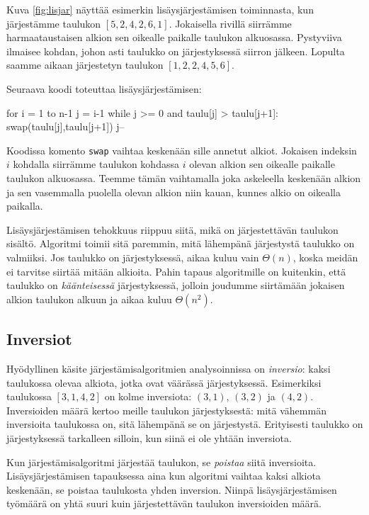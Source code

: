 Kuva \ref{fig:lisjar} näyttää esimerkin lisäysjärjestämisen
toiminnasta, kun järjes\-tämme taulukon $[5,2,4,2,6,1]$.
Jokaisella rivillä siirrämme harmaataustaisen alkion
sen oikealle paikalle taulukon alkuosassa.
Pystyviiva ilmaisee kohdan, johon asti taulukko on järjestyksessä
siirron jälkeen.
Lopulta saamme aikaan järjestetyn taulukon $[1,2,2,4,5,6]$.

Seuraava koodi toteuttaa lisäysjärjestämisen:

\begin{code}
for i = 1 to n-1
    j = i-1
    while j >= 0 and taulu[j] > taulu[j+1]:
        swap(taulu[j],taulu[j+1])
        j--
\end{code}

Koodissa komento \texttt{swap} vaihtaa keskenään
sille annetut alkiot.
Jokaisen indeksin $i$ kohdalla siirrämme taulukon
kohdassa $i$ olevan alkion sen oikealle paikalle
taulukon alkuosassa.
Teemme tämän vaihtamalla joka askeleella keskenään
alkion ja sen vasemmalla puolella olevan alkion
niin kauan, kunnes alkio on oikealla paikalla.

Lisäysjärjestämisen tehokkuus riippuu siitä,
mikä on järjestettävän taulukon sisältö.
Algoritmi toimii sitä paremmin, mitä lähempänä järjestystä
taulukko on valmiiksi.
Jos taulukko on järjestyksessä,
aikaa kuluu vain $\Theta(n)$, koska meidän ei tarvitse siirtää
mitään alkioita.
Pahin tapaus algoritmille on kuitenkin, että taulukko on
\emph{käänteisessä} järjestyksessä,
jolloin joudumme siirtämään jokaisen alkion
taulukon alkuun ja aikaa kuluu $\Theta(n^2)$.

\subsection{Inversiot}

Hyödyllinen käsite järjestämisalgoritmien analysoinnissa
on \emph{inversio}: kaksi taulukossa olevaa alkiota,
jotka ovat väärässä järjestyksessä.
Esimerkiksi taulukossa $[3,1,4,2]$ on kolme inversiota:
$(3,1)$, $(3,2)$ ja $(4,2)$.
Inversioiden määrä kertoo meille taulukon järjestyksestä:
mitä vähemmän inversioita taulukossa on,
sitä lähempänä se on järjestystä.
Erityisesti taulukko on järjestyksessä tarkalleen silloin,
kun siinä ei ole yhtään inversiota.

Kun järjestämisalgoritmi järjestää taulukon,
se \emph{poistaa} siitä inversioita.
Lisäysjärjestämisen tapauksessa aina kun
algoritmi vaihtaa kaksi alkiota keskenään,
se poistaa taulukosta yhden inversion.
Niinpä lisäysjärjestämisen työmäärä on yhtä suuri
kuin järjestettävän taulukon inversioiden määrä.

